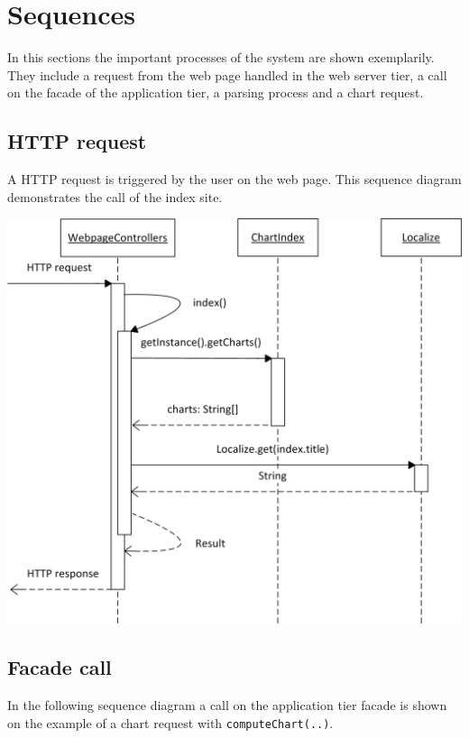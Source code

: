 \section{Sequences}
In this sections the important processes of the system are shown exemplarily. They include a request 
from the web page handled in the web server tier, a call on the facade of the application tier,
a parsing process and a chart request.

\subsection{HTTP request}
A HTTP request is triggered by the user on the web page. This sequence diagram demonstrates
the call of the index site.

\begin{center}
\includegraphics{Pictures/Seq/SeqHTTPRequest.png}
\end{center}

 
\newpage 
\subsection{Facade call}
In the following sequence diagram a call on the application tier facade is shown 
on the example of a chart request with \texttt{computeChart(..)}.

